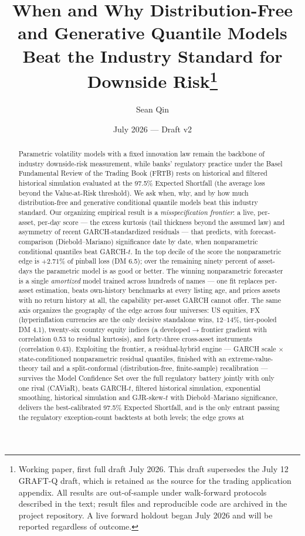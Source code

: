 \documentclass[11pt]{article}
\title{When and Why Distribution-Free and Generative Quantile Models\\
Beat the Industry Standard for Downside Risk\thanks{Working paper, first
full draft July 2026. This draft supersedes the July 12 GRAFT-Q draft,
which is retained as the source for the trading application appendix.
All results are out-of-sample under walk-forward protocols described in
the text; result files and reproducible code are archived in the project
repository. A live forward holdout began July 2026 and will be reported
regardless of outcome.}}
\author{Sean Qin}
\date{July 2026 --- Draft v2}
\theoremstyle{remark}
\begin{document}
\maketitle

\begin{abstract}
Parametric volatility models with a fixed innovation law remain the
backbone of industry downside-risk measurement, while banks' regulatory
practice under the Basel Fundamental Review of the Trading Book (FRTB)
rests on historical and filtered historical simulation evaluated at the
97.5\% Expected Shortfall (the average loss beyond the Value-at-Risk
threshold). We ask when, why, and by how much distribution-free and
generative conditional quantile models beat this industry standard. Our
organizing empirical result is a \emph{misspecification frontier}: a
live, per-asset, per-day score --- the excess kurtosis (tail thickness
beyond the assumed law) and asymmetry of recent GARCH-standardized
residuals --- that predicts, with forecast-comparison
(Diebold--Mariano) significance date by date, when nonparametric
conditional quantiles beat GARCH-$t$.
In the top decile of the score the nonparametric edge is $+2.71\%$ of
pinball loss (DM 6.5); over the remaining ninety percent of asset-days
the parametric model is as good or better. The winning nonparametric
forecaster is a single \emph{amortized} model trained across hundreds of
names --- one fit replaces per-asset estimation, beats own-history
benchmarks at every listing age, and prices assets with no return
history at all, the capability per-asset GARCH cannot offer. The same axis organizes the
geography of the edge across four universes: US equities, FX
(hyperinflation currencies are the only decisive standalone wins,
$12$--$14\%$, tier-pooled DM 4.1), twenty-six country equity indices (a
developed$\to$frontier gradient with correlation 0.53 to residual
kurtosis), and forty-three cross-asset instruments (correlation 0.43).
Exploiting the frontier, a residual-hybrid engine --- GARCH scale
$\times$ state-conditioned nonparametric residual quantiles, finished
with an extreme-value-theory tail and a split-conformal (distribution-free,
finite-sample) recalibration --- survives the Model Confidence Set over
the full regulatory battery jointly with only one rival (CAViaR), beats
GARCH-$t$, filtered historical simulation, exponential smoothing,
historical simulation and GJR-skew-$t$ with Diebold--Mariano
significance, delivers the best-calibrated 97.5\% Expected Shortfall,
and is the only entrant passing the regulatory
exception-count backtests at both levels; the edge grows at

\end{abstract}
\end{document}
